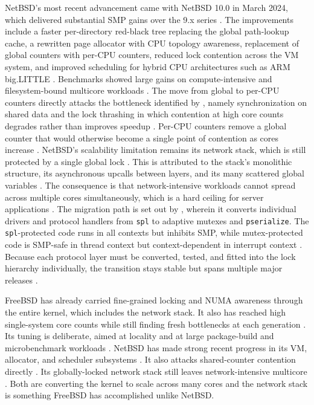 NetBSD's most recent advancement came with NetBSD 10.0 in March 2024, which delivered substantial SMP gains over the
9.x series \parencite{netbsd_10_0}. The improvements include a faster per-directory red-black tree replacing the global
path-lookup cache, a rewritten page allocator with CPU topology awareness, replacement of global counters with per-CPU
counters, reduced lock contention across the VM system, and improved scheduling for hybrid CPU architectures such
as ARM big.LITTLE \parencite{netbsd_10_0}. Benchmarks showed large gains on compute-intensive and filesystem-bound
multicore workloads \parencite{netbsd_10_0}. The move from global to per-CPU counters directly attacks the bottleneck
identified by \textcite{cui2011}, namely synchronization on shared data and the lock thrashing in which contention at
high core counts degrades rather than improves speedup \parencite{cui2011}. Per-CPU counters remove a global counter
that would otherwise become a single point of contention as cores increase \parencite{cui2011}. NetBSD's scalability
limitation remains its network stack, which is still protected by a single global lock \parencite{netbsd_smp_networking}.
This is attributed to the stack's monolithic structure, its asynchronous upcalls between layers, and its many scattered
global variables \parencite{netbsd_smpnet}. The consequence is that network-intensive workloads cannot spread across
multiple cores simultaneously, which is a hard ceiling for server applications \parencite{netbsd_smp_networking}.
The migration path is set out by \textcite{ozaki2015}, wherein it converts individual drivers and protocol handlers
from \texttt{spl} to adaptive mutexes and \texttt{pserialize}. The  \texttt{spl}-protected code runs in all contexts
but inhibits SMP, while mutex-protected code is SMP-safe in thread context but context-dependent in interrupt context
\parencite{ozaki2015}. Because each protocol layer must be converted, tested, and fitted into the lock hierarchy individually,
the transition stays stable but spans multiple major releases \parencite{ozaki2015}.

FreeBSD has already carried fine-grained locking and NUMA awareness through the entire kernel, which includes the
network stack. It also has reached high single-system core counts while still finding fresh bottlenecks at each
generation \parencite{freebsd_guzik}. Its tuning is deliberate, aimed at locality and at large package-build and microbenchmark
workloads \parencite{freebsd_guzik}. NetBSD has made strong recent progress in its VM, allocator, and scheduler subsystems
\parencite{netbsd_10_0}. It also attacks shared-counter contention directly \parencite{netbsd_10_0}. Its globally-locked network
stack still leaves network-intensive multicore \parencite{netbsd_smp_networking}. Both are converting the kernel to scale
across many cores and the network stack is something FreeBSD has accomplished unlike NetBSD.

